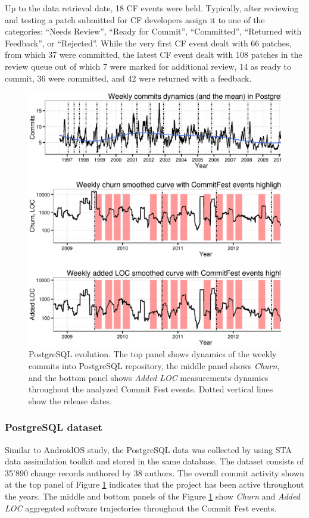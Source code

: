 Up to the data retrieval date, 18 CF events were held. Typically, after reviewing and testing a patch submitted for CF developers assign it to one of the categories: ``Needs Review'', ``Ready for Commit'', ``Committed'', ``Returned with Feedback'', or ``Rejected''. While the very first CF event dealt with 66 patches, from which 37 were committed, the latest CF event dealt with 108 patches in the review queue out of which 7 were marked for additional review, 14 as ready to commit, 36 were committed, and 42 were returned with a feedback.

\begin{figure}[t!]
   \centering
   \includegraphics[width=150mm]{figures/postgre_commits_dynamics.eps}
   \caption{PostgreSQL evolution. The top panel shows dynamics of the weekly commits into PostgreSQL repository, the middle panel shows \textit{Churn}, and the bottom panel shows \textit{Added LOC} measurements dynamics throughout the analyzed Commit Fest events. Dotted vertical lines show the release dates.}
   \label{fig:postgre_dynamics}
\end{figure}

\subsubsection{PostgreSQL dataset}
Similar to AndroidOS study, the PostgreSQL data was collected by using STA data assimilation toolkit and stored in the same database. The dataset consists of 35'890 change records authored by 38 authors. The overall commit activity shown at the top panel of Figure \ref{fig:postgre_dynamics} indicates that the project has been active throughout the years. The middle and bottom panels of the Figure \ref{fig:postgre_dynamics} show \textit{Churn} and \textit{Added LOC} aggregated software trajectories throughout the Commit Fest events.

